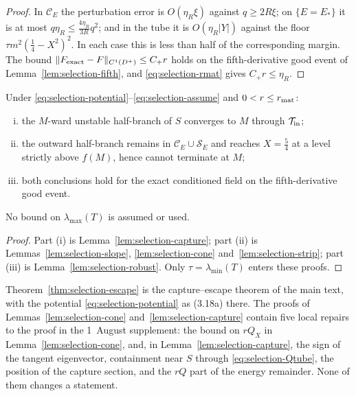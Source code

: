 \begin{proof}
In $\mathcal C_E$ the perturbation error is $O(\eta_R\xi)$ against $q\ge2R\xi$; on $\{E=E_*\}$ it is at most $q\eta_R\le\frac{4\eta_R}{3R}q^2$; and in the tube it is $O(\eta_R|Y|)$ against the floor $\tau m^2(\frac14-X^2)^2$. In each case this is less than half of the corresponding margin. The bound $\|F_{\rm exact}-F\|_{C^1(D^+)}\le C_+r$ holds on the fifth-derivative good event of Lemma~\ref{lem:selection-fifth}, and \eqref{eq:selection-rmat} gives $C_+r\le\eta_R$.
\end{proof}

\begin{theorem}\label{thm:selection-escape}
Under \eqref{eq:selection-potential}--\eqref{eq:selection-assume} and $0<r\le r_{\rm mat}$:
\begin{enumerate}[(i)]
\item the $M$-ward unstable half-branch of $S$ converges to $M$ through $\mathcal T_{\rm in}$;
\item the outward half-branch remains in $\mathcal C_E\cup\mathcal S_E$ and reaches $X=\frac54$ at a level strictly above $f(M)$, hence cannot terminate at $M$;
\item both conclusions hold for the exact conditioned field on the fifth-derivative good event.
\end{enumerate}
No bound on $\lambda_{\max}(T)$ is assumed or used.
\end{theorem}

\begin{proof}
Part (i) is Lemma~\ref{lem:selection-capture}; part (ii) is Lemmas~\ref{lem:selection-slope}, \ref{lem:selection-cone} and~\ref{lem:selection-strip}; part (iii) is Lemma~\ref{lem:selection-robust}. Only $\tau=\lambda_{\min}(T)$ enters these proofs.
\end{proof}

Theorem~\ref{thm:selection-escape} is the capture--escape theorem of the main text, with the potential \eqref{eq:selection-potential} as (3.18a) there. The proofs of Lemmas~\ref{lem:selection-cone} and~\ref{lem:selection-capture} contain five local repairs to the proof in the 1~August supplement: the bound on $rQ_X$ in Lemma~\ref{lem:selection-cone}, and, in Lemma~\ref{lem:selection-capture}, the sign of the tangent eigenvector, containment near $S$ through \eqref{eq:selection-Qtube}, the position of the capture section, and the $rQ$ part of the energy remainder. None of them changes a statement.

